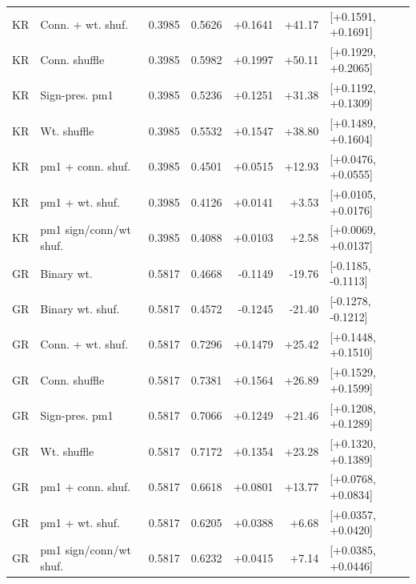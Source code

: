 \begin{tabular}{llrrrrl}
KR & Conn. + wt. shuf. & 0.3985 & 0.5626 & +0.1641 & +41.17 & [+0.1591, +0.1691] \\
KR & Conn. shuffle & 0.3985 & 0.5982 & +0.1997 & +50.11 & [+0.1929, +0.2065] \\
KR & Sign-pres. pm1 & 0.3985 & 0.5236 & +0.1251 & +31.38 & [+0.1192, +0.1309] \\
KR & Wt. shuffle & 0.3985 & 0.5532 & +0.1547 & +38.80 & [+0.1489, +0.1604] \\
KR & pm1 + conn. shuf. & 0.3985 & 0.4501 & +0.0515 & +12.93 & [+0.0476, +0.0555] \\
KR & pm1 + wt. shuf. & 0.3985 & 0.4126 & +0.0141 & +3.53 & [+0.0105, +0.0176] \\
KR & pm1 sign/conn/wt shuf. & 0.3985 & 0.4088 & +0.0103 & +2.58 & [+0.0069, +0.0137] \\
GR & Binary wt. & 0.5817 & 0.4668 & -0.1149 & -19.76 & [-0.1185, -0.1113] \\
GR & Binary wt. shuf. & 0.5817 & 0.4572 & -0.1245 & -21.40 & [-0.1278, -0.1212] \\
GR & Conn. + wt. shuf. & 0.5817 & 0.7296 & +0.1479 & +25.42 & [+0.1448, +0.1510] \\
GR & Conn. shuffle & 0.5817 & 0.7381 & +0.1564 & +26.89 & [+0.1529, +0.1599] \\
GR & Sign-pres. pm1 & 0.5817 & 0.7066 & +0.1249 & +21.46 & [+0.1208, +0.1289] \\
GR & Wt. shuffle & 0.5817 & 0.7172 & +0.1354 & +23.28 & [+0.1320, +0.1389] \\
GR & pm1 + conn. shuf. & 0.5817 & 0.6618 & +0.0801 & +13.77 & [+0.0768, +0.0834] \\
GR & pm1 + wt. shuf. & 0.5817 & 0.6205 & +0.0388 & +6.68 & [+0.0357, +0.0420] \\
GR & pm1 sign/conn/wt shuf. & 0.5817 & 0.6232 & +0.0415 & +7.14 & [+0.0385, +0.0446] \\
\bottomrule
\end{tabular}
